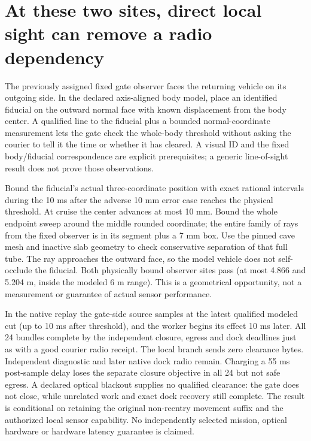 \documentclass{article}
\begin{document}
\section*{At these two sites, direct local sight can remove a radio dependency}
The previously assigned fixed gate observer faces the returning
vehicle on its outgoing side. In the declared axis-aligned body
model, place an identified fiducial on the outward normal face with
known displacement from the body center. A qualified line to the
fiducial plus a bounded normal-coordinate measurement lets the
gate check the whole-body threshold without asking the courier
to tell it the time or whether it has cleared. A visual ID and the
fixed body/fiducial correspondence are explicit prerequisites;
a generic line-of-sight result does not prove those observations.

Bound the fiducial's actual three-coordinate position with exact
rational intervals during the 10 ms after the adverse 10 mm error
case reaches the physical threshold. At cruise the center advances
at most 10 mm. Bound the whole endpoint sweep around the
middle rounded coordinate; the entire family of rays from the
fixed observer is in its segment plus a 7 mm box. Use the pinned
cave mesh and inactive slab geometry to check conservative
separation of that full tube. The ray approaches the outward face,
so the model vehicle does not self-occlude the fiducial. Both
physically bound observer sites pass (at most 4.866 and 5.204 m,
inside the modeled 6 m range). This is a geometrical opportunity,
not a measurement or guarantee of actual sensor performance.

In the native replay the gate-side source samples at the latest
qualified modeled cut (up to 10 ms after threshold), and the
worker begins its effect 10 ms later. All 24 bundles complete
by the independent closure, egress and dock deadlines just as
with a good courier radio receipt. The local branch sends zero
clearance bytes. Independent diagnostic and later native dock
radio remain. Charging a 55 ms post-sample delay loses the
separate closure objective in all 24 but not safe egress.
A declared optical blackout supplies no qualified clearance:
the gate does not close, while unrelated work and exact dock
recovery still complete. The result is conditional on retaining
the original non-reentry movement suffix and the authorized
local sensor capability. No independently selected mission,
optical hardware or hardware latency guarantee is claimed.
\end{document}
